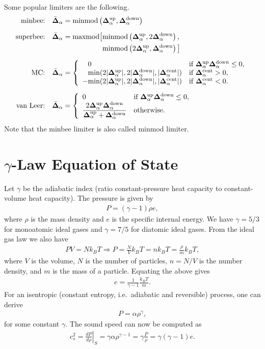 \documentclass{article}
\begin{document}
Some popular limiters are the following.
\begin{align}
  \label{eq:slope-limiters}
  \text{minbee:}   \quad & \db = \text{minmod}\left(\du, \dd\right) \\[6pt]
  \text{superbee:} \quad & \db = \text{maxmod}\big[\text{minmod}\left(\du, 2\dd\right), \nonumber \\
      & \hphantom{\db = \text{maxmod}\big[} \text{minmod}\left(2\du,\dd\right)\big] \\[6pt]
  \text{MC:} \quad       & \db = \left\{ \begin{array}{ll}
    \phantom{-}0 & \text{if } \du\dd \leq 0, \\
    \phantom{-}\text{min}(2|\du|, 2|\dd|, |\dc|) & \text{if } \dc > 0, \\
    -\text{min}(2|\du|, 2|\dd|, |\dc|) & \text{if } \dc < 0.
  \end{array} \right. \\[6pt]
  \text{van Leer:} \quad & \db = \left\{ \begin{array}{ll}
    0 & \text{if } \du\dd \leq 0, \\
    \dfrac{2\du\dd}{\du+\dd} & \text{otherwise.}
  \end{array} \right.
\end{align}
Note that the minbee limiter is also called minmod limiter.

\section{$\gamma$-Law Equation of State}

Let $\gamma$ be the adiabatic index (ratio constant-pressure heat capacity to constant-volume heat
capacity). The pressure is given by
\begin{align}
  \label{eq:gamma-Law}
  P = (\gamma-1)\rho e,
\end{align}
where $\rho$ is the mass density and $e$ is the specific internal energy. We have $\gamma = 5/3$ for
monoatomic ideal gases and $\gamma = 7/5$ for diatomic ideal gases. From the ideal gas law we
also have
\begin{align}
  \label{eq:ideal-gas}
  PV = Nk_BT \Rightarrow P = \frac{N}{V}k_BT = nk_BT = \frac{\rho}{m}k_BT,
\end{align}
where $V$ is the volume, $N$ is the number of particles, $n = N/V$ is the number density, and $m$ is
the mass of a particle. Equating the above gives
\begin{align}
  \label{eq:gamma-law_e}
  e = \frac{1}{\gamma-1}\frac{k_BT}{m}.
\end{align}
For an isentropic (constant entropy, i.e.\ adiabatic and reversible) process, one can derive
\begin{align}
  \label{eq:isentropic}
  P = \alpha \rho^\gamma,
\end{align}
for some constant $\gamma$. The sound speed can now be computed as
\begin{align}
  \label{eq:sound-speed}
  c_s^2 = \left.\frac{dP}{d\rho}\right|_S = \gamma \alpha \rho^{\gamma-1} = \gamma\frac{P}{\rho} =
  \gamma(\gamma-1)e.
\end{align}
\end{document}
